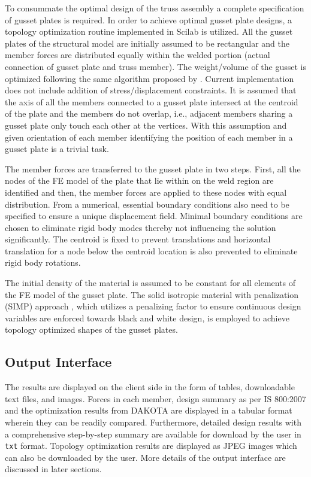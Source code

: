 \documentclass[preprint]{elsarticle}
\begin{document}
To consummate the optimal design of the truss assembly a complete specification
of gusset plates is required. In order to achieve optimal gusset plate designs,
a topology optimization routine implemented in Scilab is utilized. All the
gusset plates of the structural model are initially assumed to be rectangular
and the member forces are distributed equally within the welded portion (actual
connection of gusset plate and truss member). The weight/volume of the gusset is
optimized following the same algorithm proposed by \citet{sigmund200199}.
Current implementation does not include addition of stress/displacement
constraints. It is assumed that the axis of all the members connected to a gusset
plate intersect at the centroid of the plate and the members do not overlap,
i.e., adjacent members sharing a gusset plate only touch each other at the vertices.
With this assumption and given orientation of each member identifying the
position of each member in a gusset plate is a trivial task.

The member forces are transferred to the gusset plate in two steps. First, all
the nodes of the FE model of the plate that lie within on the weld region are
identified and then, the member forces are applied to these nodes with equal
distribution. From a numerical, essential boundary conditions also need to be
specified to ensure a unique displacement field. Minimal boundary conditions are
chosen to eliminate rigid body modes thereby not influencing the solution
significantly. The centroid is fixed to prevent translations and horizontal
translation for a node below the centroid location is also prevented to
eliminate rigid body rotations.

The initial density of the material is assumed to be constant for all elements
of the FE model of the gusset plate. The solid isotropic material with
penalization (SIMP) approach \cite{Bendsoe1995}, which utilizes a penalizing
factor to ensure continuous design variables are enforced towards black and
white design, is employed to achieve topology optimized shapes of the gusset
plates.


\subsection{Output Interface}
The results are displayed on the client side in the form of tables, downloadable
text files, and images. Forces in each member, design summary
as per IS 800:2007 and the optimization results from DAKOTA are displayed in a
tabular format wherein they can be readily compared. Furthermore, detailed design 
results with a comprehensive step-by-step summary are available for download by
the user in \texttt{txt} format. Topology optimization results are displayed as 
JPEG images which can also be downloaded by the user. More details of the
output interface are discussed in later sections.
\end{document}
